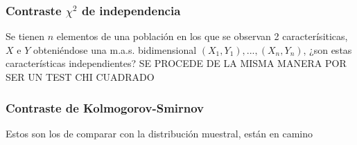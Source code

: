 \documentclass[a4paper,12pt]{article}
\begin{document}
\subsubsection{Contraste $\chi^2$ de independencia}
Se tienen $n$ elementos de una población en los que se observan 2 caracterísiticas, $X$ e $Y$ obteniéndose una m.a.s. bidimensional $(X_1,Y_1),...,(X_n,Y_n)$, ¿son estas características independientes?
SE PROCEDE DE LA MISMA MANERA POR SER UN TEST CHI CUADRADO

\subsubsection{Contraste de Kolmogorov-Smirnov }
Estos son los de comparar con la distribución muestral, están en camino









































\end{document}
